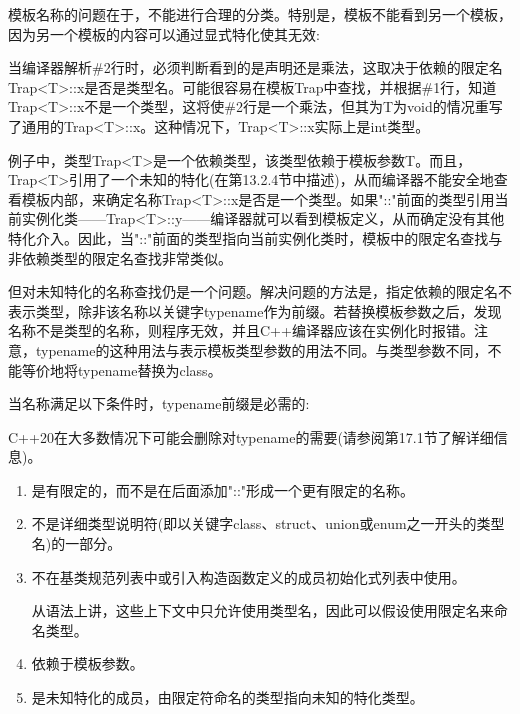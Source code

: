 模板名称的问题在于，不能进行合理的分类。特别是，模板不能看到另一个模板，因为另一个模板的内容可以通过显式特化使其无效:


当编译器解析\#2行时，必须判断看到的是声明还是乘法，这取决于依赖的限定名Trap<T>::x是否是类型名。可能很容易在模板Trap中查找，并根据\#1行，知道Trap<T>::x不是一个类型，这将使\#2行是一个乘法，但其为T为void的情况重写了通用的Trap<T>::x。这种情况下，Trap<T>::x实际上是int类型。

例子中，类型Trap<T>是一个依赖类型，该类型依赖于模板参数T。而且，Trap<T>引用了一个未知的特化(在第13.2.4节中描述)，从而编译器不能安全地查看模板内部，来确定名称Trap<T>::x是否是一个类型。如果"::"前面的类型引用当前实例化类——Trap<T>::y——编译器就可以看到模板定义，从而确定没有其他特化介入。因此，当"::"前面的类型指向当前实例化类时，模板中的限定名查找与非依赖类型的限定名查找非常类似。

但对未知特化的名称查找仍是一个问题。解决问题的方法是，指定依赖的限定名不表示类型，除非该名称以关键字typename作为前缀。若替换模板参数之后，发现名称不是类型的名称，则程序无效，并且C++编译器应该在实例化时报错。注意，typename的这种用法与表示模板类型参数的用法不同。与类型参数不同，不能等价地将typename替换为class。

当名称满足以下条件时，typename前缀是必需的:

\begin{notice}C++20在大多数情况下可能会删除对typename的需要(请参阅第17.1节了解详细信息)。
\end{notice}

\begin{enumerate}
\item 
是有限定的，而不是在后面添加"::"形成一个更有限定的名称。

\item 
不是详细类型说明符(即以关键字class、struct、union或enum之一开头的类型名)的一部分。

\item 
不在基类规范列表中或引入构造函数定义的成员初始化式列表中使用。

\begin{notice}[colback=webgreen!5!white,colframe=webgreen!75!black]
从语法上讲，这些上下文中只允许使用类型名，因此可以假设使用限定名来命名类型。
\end{notice}

\item 
依赖于模板参数。

\item 
是未知特化的成员，由限定符命名的类型指向未知的特化类型。
\end{enumerate}

